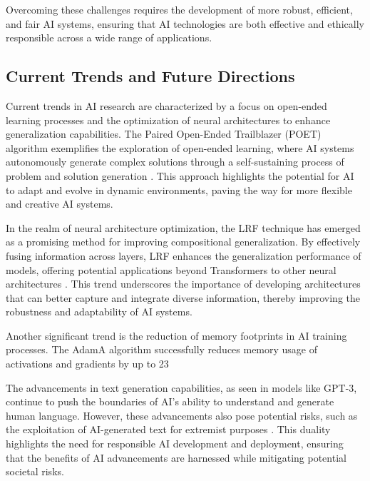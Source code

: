 Overcoming these challenges requires the development of more robust, efficient, and fair AI systems, ensuring that AI technologies are both effective and ethically responsible across a wide range of applications.



\subsection{Current Trends and Future Directions} \label{subsec:Current Trends and Future Directions}



Current trends in AI research are characterized by a focus on open-ended learning processes and the optimization of neural architectures to enhance generalization capabilities. The Paired Open-Ended Trailblazer (POET) algorithm exemplifies the exploration of open-ended learning, where AI systems autonomously generate complex solutions through a self-sustaining process of problem and solution generation \cite{wang2019pairedopenendedtrailblazerpoet}. This approach highlights the potential for AI to adapt and evolve in dynamic environments, paving the way for more flexible and creative AI systems.



In the realm of neural architecture optimization, the LRF technique has emerged as a promising method for improving compositional generalization. By effectively fusing information across layers, LRF enhances the generalization performance of models, offering potential applications beyond Transformers to other neural architectures \cite{zheng2023layerwiserepresentationfusioncompositional}. This trend underscores the importance of developing architectures that can better capture and integrate diverse information, thereby improving the robustness and adaptability of AI systems.



Another significant trend is the reduction of memory footprints in AI training processes. The AdamA algorithm successfully reduces memory usage of activations and gradients by up to 23%



The advancements in text generation capabilities, as seen in models like GPT-3, continue to push the boundaries of AI's ability to understand and generate human language. However, these advancements also pose potential risks, such as the exploitation of AI-generated text for extremist purposes \cite{mcguffie2020radicalizationrisksgpt3advanced}. This duality highlights the need for responsible AI development and deployment, ensuring that the benefits of AI advancements are harnessed while mitigating potential societal risks.



